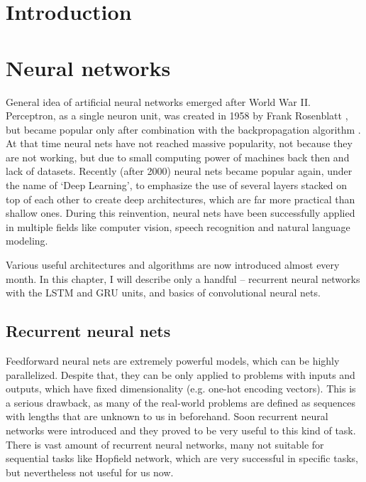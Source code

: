 
\chapter{Introduction}

\chapter{Neural networks} 
General idea of artificial neural networks emerged after World War II. Perceptron, as a single neuron unit, was created in 1958 by Frank Rosenblatt \cite{rosenblatt58a}, but became popular only after combination with the backpropagation algorithm \cite{bryson1975applied}\cite{werbos1974beyond}. At that time neural nets have not reached massive popularity, not because they are not working, but due to small computing power of machines back then and lack of datasets. Recently (after 2000) neural nets became popular again, under the name of \textquoteleft Deep Learning\textquoteright, to emphasize the use of several layers stacked on top of each other to create deep architectures, which are far more practical than shallow ones. During this reinvention, neural nets have been successfully applied in multiple fields like computer vision, speech recognition and natural language modeling.

Various useful architectures and algorithms are now introduced almost every month. In this chapter, I will describe only a handful -- recurrent neural networks with the LSTM and GRU units, and basics of convolutional neural nets.

	\section{Recurrent neural nets}
Feedforward neural nets are extremely powerful models, which can be highly parallelized. Despite that, they can be only applied to problems with inputs and outputs, which have fixed dimensionality (e.g. one-hot encoding vectors). This is a serious drawback, as many of the real-world problems are defined as sequences with lengths that are unknown to us in beforehand. Soon recurrent neural networks were introduced and they proved to be very useful to this kind of task. There is vast amount of recurrent neural networks, many not suitable for sequential tasks like Hopfield network, which are very successful in specific tasks, but nevertheless not useful for us now.

